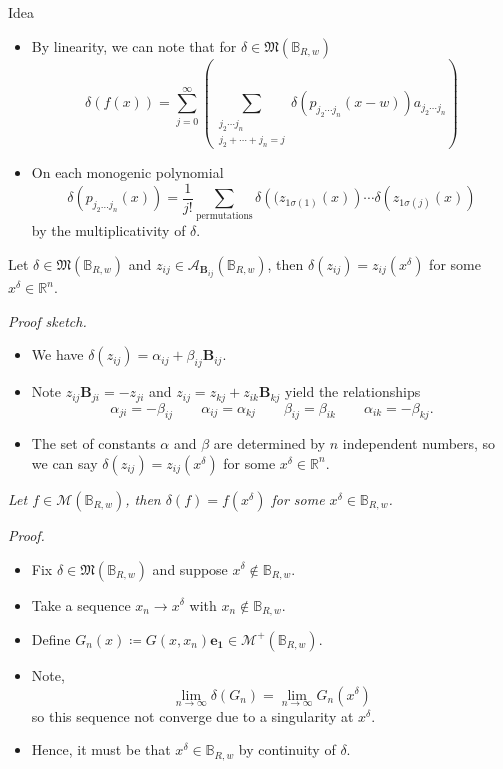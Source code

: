 \documentclass[aspectratio=169]{beamer}
\newcommand{\R}{\mathbb{R}}
\newcommand{\algebra}{\mathcal{A}}
\newcommand{\characters}{\mathfrak{M}}
\newcommand{\monogenics}{\mathcal{M}}
\newcommand{\ball}{\mathbb{B}}
\newcommand{\blade}[1]{\boldsymbol{#1}}
\newcommand{\bivector}{\blade{B}}
\begin{document}
\begin{frame}{Idea}
\vfill
\begin{itemize}
\pause
\item By linearity, we can note that for $\delta \in \characters(\ball_{R,w})$
\[
\delta(f(x)) = \sum_{j=0}^\infty \left(\sum_{\substack{{j_2 \cdots j_n} \\ {j_2 + \cdots + j_n = j}}} \delta(p_{j_2 \cdots j_n} (x-w)) a_{j_2 \cdots j_n} \right)
\]
\pause
\item On each monogenic polynomial
\[
\delta(p_{j_2 \dots j_n}(x)) = \frac{1}{j!} \sum_{\textrm{permutations}}\delta\left((z_{1\sigma(1)}(x)\right) \cdots \delta\left(z_{1\sigma(j)}(x)\right)
\]
by the multiplicativity of $\delta$.
\end{itemize}
\vfill
\end{frame}

\begin{frame}{}
\vfill
\begin{lemma}
Let $\delta \in \characters(\ball_{R,w})$ and $z_{ij}\in \algebra_{\bivector_{ij}}(\ball_{R,w})$, then $\delta(z_{ij})=z_{ij}(x^\delta)$ for some $x^\delta \in \R^n$.
\end{lemma}
\pause
\emph{Proof sketch.} 
\begin{itemize}
\pause
\item We have $\delta(z_{ij})=\alpha_{ij}+\beta_{ij}\bivector_{ij}$.
\pause
\item Note $z_{ij}\bivector_{ji}=-z_{ji}$ and $z_{ij}=z_{kj}+z_{ik}\bivector_{kj}$ yield the relationships
\[
\alpha_{ji}=-\beta_{ij} \qquad \alpha_{ij}=\alpha_{kj} \qquad \beta_{ij}=\beta_{ik} \qquad \alpha_{ik}=-\beta_{kj}.
\]
\pause 
\item The set of constants $\alpha$ and $\beta$ are determined by $n$ independent numbers, so we can say $\delta(z_{ij})=z_{ij}(x^\delta)$ for some $x^\delta \in \R^n$.
\end{itemize}
\vfill
\end{frame}

\begin{frame}{}
\vfill
\begin{lemma}[Identification]
\emph{Let $f\in \mathcal{M}(\ball_{R,w})$, then $\delta (f)=f(x^\delta)$ for some $x^\delta \in \ball_{R,w}$.}
\end{lemma}
\pause
\emph{Proof.} 
\begin{itemize}
\pause
\item Fix $\delta \in \characters(\ball_{R,w})$ and suppose $x^\delta \notin \ball_{R,w}$. 
\pause
\item Take a sequence $x_n \to x^\delta$ with $x_n \notin \ball_{R,w}$.
\pause
\item Define $G_n(x)\coloneqq G(x,x_n)\blade{e_1} \in \monogenics^+(\ball_{R,w})$.
\pause 
\item Note,
\[
\lim_{n\to \infty} \delta(G_n) = \lim_{n\to \infty} G_n(x^\delta)
\]
so this sequence not converge due to a singularity at $x^\delta$. 
\pause
\item Hence, it must be that $x^\delta \in \ball_{R,w}$ by continuity of $\delta$.
\end{itemize}
\vfill
\end{frame}
\end{document}

